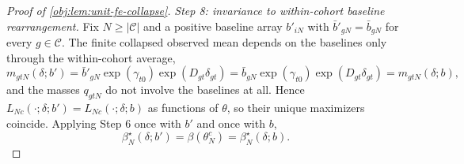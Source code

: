 \documentclass[11pt]{article}
\begin{document}
\begin{proof}[Proof of \cref{obj:lem:unit-fe-collapse}]
\textit{Step 8: invariance to within-cohort baseline rearrangement.} Fix \(N\ge|\mathcal C|\) and a positive baseline array \(b'_{iN}\) with \(\bar b'_{gN}=\bar b_{gN}\) for every \(g\in\mathcal C\). The finite collapsed observed mean depends on the baselines only through the within-cohort average,
\[
m_{gtN}(\delta;b')=\bar b'_{gN}\exp(\gamma_{t0})\exp(D_{gt}\delta_{gt})
=\bar b_{gN}\exp(\gamma_{t0})\exp(D_{gt}\delta_{gt})=m_{gtN}(\delta;b),
\]
and the masses \(q_{gtN}\) do not involve the baselines at all. Hence \(L_{Nc}(\cdot;\delta;b')=L_{Nc}(\cdot;\delta;b)\) as functions of \(\theta\), so their unique maximizers coincide. Applying Step 6 once with \(b'\) and once with \(b\),
\[
\beta_N^\star(\delta;b')=\beta(\theta_N^c)=\beta_N^\star(\delta;b).
\]
\end{proof}
\end{document}
